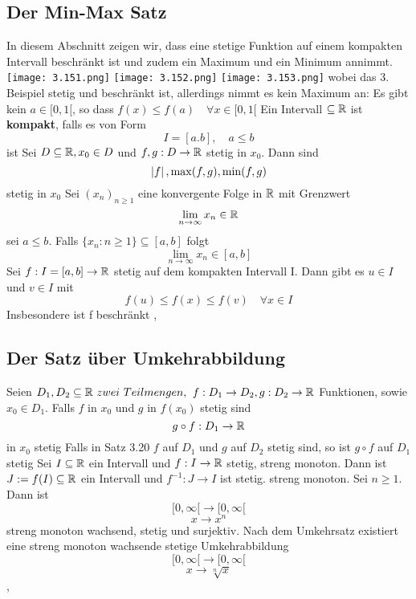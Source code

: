 \subsection{Der Min-Max Satz}
In diesem Abschnitt zeigen wir, dass eine stetige Funktion auf einem kompakten Intervall beschränkt ist und zudem ein Maximum und ein Minimum annimmt.
\texttt{[image: 3.151.png]}
\texttt{[image: 3.152.png]}
\texttt{[image: 3.153.png]}
wobei das 3. Beispiel stetig und beschränkt ist, allerdings nimmt es kein Maximum an: Es gibt kein \( a \in [0,1[\), so dass \( f(x) \leq f(a) \quad \forall x \in [0,1[\)
\Def[3.16] Ein Intervall \(\subseteq \mathbb{R}\) ist \textbf{kompakt}, falls es von Form
\[I = [a.b], \quad a \leq b\] ist \newline
\Lemma[3.17] Sei \(D \subseteq \mathbb{R}, x_0 \in D \) und \(f,g : D \rightarrow \mathbb{R} \) stetig in \(x_0\). Dann sind
\[ \left\lvert f \right\rvert, \max(f,g), \min(f,g) \] stetig in \(x_0\) \newline
\Lemma[3.18] Sei \((x_n)_{n \geq 1}\) eine konvergente Folge in \(\mathbb{R}\) mit Grenzwert
\[\lim\limits_{n \rightarrow \infty} x_n \in \mathbb{R} \]
sei \(a \leq b\). Falls \(\{x_n : n \geq 1\} \subseteq [a,b]\) folgt
\[\lim\limits_{n \rightarrow \infty} x_n \in [a,b] \]
\Satz[3.19] Sei \(f : I = [a,b] \rightarrow \mathbb{R} \) stetig auf dem kompakten Intervall I. Dann gibt es \(u \in I \) und \(v \in I\) mit
\[f(u) \leq f(x) \leq f(v) \quad \forall x \in I\]
Insbesondere ist f beschränkt
\sep
\subsection{Der Satz über  Umkehrabbildung} 
\Satz[3.20] Seien \(D_1, D_2 \subseteq \R \ zwei \ Teilmengen,\) \newline \(f: D_1 \rightarrow D_2, g: D_2 \rightarrow \mathbb{R}\) Funktionen, sowie \(x_0 \in D_1\). Falls \(f\) in \(x_0\) und \(g\) in \(f(x_0)\) stetig sind
\[ g \circ f : D_1 \rightarrow \mathbb{R} \]
in \(x_0\) stetig \newline
\Korollar[3.21] Falls in Satz 3.20 \(f\) auf \(D_1\) und \(g\) auf \(D_2\) stetig sind, so ist \(g \circ f\) auf \(D_1\) stetig \newline
\Satz[3.22] Sei \(I \subseteq \mathbb{R}\) ein Intervall und \(f: I \rightarrow \mathbb{R}\) stetig, streng monoton. Dann ist \(J:= f(I) \subseteq \mathbb{R}\) ein Intervall und \(f^{-1} : J \rightarrow I \) ist stetig. streng monoton. \newline
\Bsp[3.23] Sei \( n \geq 1\). Dann ist
\[ [0, \infty[ \rightarrow [0,\infty[ \]
\[ x \rightarrow x^n\]
streng monoton wachsend, stetig und surjektiv. Nach dem Umkehrsatz existiert eine streng monoton wachsende stetige Umkehrabbildung
\[ [0, \infty[ \rightarrow [0, \infty[\]
\[ x \rightarrow \sqrt[n]{x}\]
\sep
